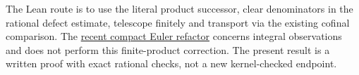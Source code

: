 \documentclass[11pt]{article}
\begin{document}
The Lean route is to use the literal product successor, clear
denominators in the rational defect estimate, telescope finitely
and transport via the existing cofinal comparison. The
\href{https://github.com/VladimirReshetnikov/ProveIt/commit/063656519229a310f5de38fbe5d993a13df43408}{recent compact Euler refactor}
concerns integral observations and does not perform this finite-product
correction. The present result is a written proof with exact
rational checks, not a new kernel-checked endpoint.
\end{document}
